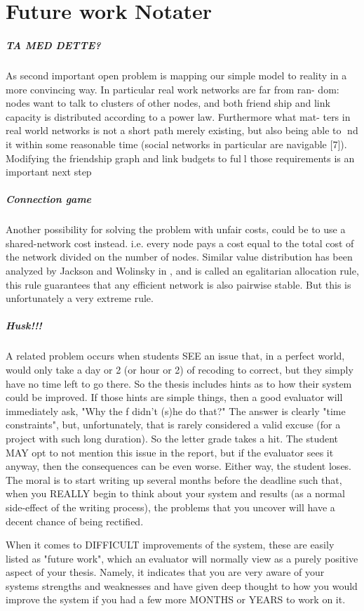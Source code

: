 \section{Future work Notater}
\label{chp:futurework} 
\subparagraph{TA MED DETTE?}
As second important open problem is mapping our simple model to reality
in a more convincing way. In particular real work networks are far from ran-
dom: nodes want to talk to clusters of other nodes, and both friend ship and
link capacity is distributed according to a power law. Furthermore what mat-
ters in real world networks is not a short path merely existing, but also being
able to nd it within some reasonable time (social networks in particular are
navigable [7]). Modifying the friendship graph and link budgets to full those
requirements is an important next step

\subparagraph{Connection game}
Another possibility for solving the problem with unfair costs, could be to use a shared-network cost instead. i.e. every node pays a cost equal to the total cost of the network divided on the number of nodes. 
Similar value distribution has been analyzed by Jackson and Wolinsky in \cite{jackson1996strategic}, and is called an egalitarian allocation rule, this rule guarantees that any efficient network is also pairwise stable. But this is unfortunately a very extreme rule.


\subparagraph{Husk!!!}
A related problem occurs when students SEE an issue that, in a perfect world, would only take a day or 2 (or hour or 2) of recoding to correct, but they simply have no time left to go there. So the thesis includes hints as to how their system could be improved. If those hints are simple things, then a good evaluator will immediately ask, "Why the f didn't (s)he do that?" The answer is clearly "time constraints", but, unfortunately, that is rarely considered a valid excuse (for a project with such long duration). So the letter grade takes a hit. The student MAY opt to not mention this issue in the report, but if the evaluator sees it anyway, then the consequences can be even worse. Either way, the student loses. The moral is to start writing up several months before the deadline such that, when you REALLY begin to think about your system and results (as a normal side-effect of the writing process), the problems that you uncover will have a decent chance of being rectified.

When it comes to DIFFICULT improvements of the system, these are easily listed as "future work", which an evaluator will normally view as a purely positive aspect of your thesis. Namely, it indicates that you are very aware of your systems strengths and weaknesses and have given deep thought to how you would improve the system if you had a few more MONTHS or YEARS to work on it.
